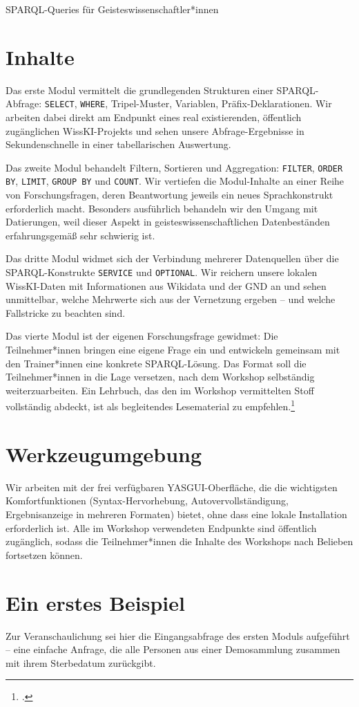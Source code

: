 \begin{beitrag}{SPARQL-Queries für Geisteswissenschaftler*innen}
\section{Inhalte}
Das erste Modul vermittelt die grundlegenden Strukturen einer SPARQL-Abfrage: \texttt{SELECT}, \texttt{WHERE}, Tripel-Muster, Variablen, Präfix-Deklarationen. Wir arbeiten dabei direkt am Endpunkt eines real existierenden, öffentlich zugänglichen WissKI-Projekts und sehen unsere Abfrage-Ergebnisse in Sekundenschnelle in einer tabellarischen Auswertung.

Das zweite Modul behandelt Filtern, Sortieren und Aggregation: \texttt{FILTER}, \texttt{ORDER BY}, \texttt{LIMIT}, \texttt{GROUP BY} und \texttt{COUNT}. Wir vertiefen die Modul-Inhalte an einer Reihe von Forschungsfragen, deren Beantwortung jeweils ein neues Sprachkonstrukt erforderlich macht. Besonders ausführlich behandeln wir den Umgang mit Datierungen, weil dieser Aspekt in geisteswissenschaftlichen Datenbeständen erfahrungsgemäß sehr schwierig ist.

Das dritte Modul widmet sich der Verbindung mehrerer Datenquellen über die SPARQL-Konstrukte \texttt{SERVICE} und \texttt{OPTIONAL}. Wir reichern unsere lokalen WissKI-Daten mit Informationen aus Wikidata und der GND an und sehen unmittelbar, welche Mehrwerte sich aus der Vernetzung ergeben -- und welche Fallstricke zu beachten sind.

Das vierte Modul ist der eigenen Forschungsfrage gewidmet: Die Teilnehmer*innen bringen eine eigene Frage ein und entwickeln gemeinsam mit den Trainer*innen eine konkrete SPARQL-Lösung. Das Format soll die Teilnehmer*innen in die Lage versetzen, nach dem Workshop selbständig weiterzuarbeiten. Ein Lehrbuch, das den im Workshop vermittelten Stoff vollständig abdeckt, ist als begleitendes Lesematerial zu empfehlen.\footcite[112]{schubert2025-sparql-lehrbuch}

\section{Werkzeugumgebung}
Wir arbeiten mit der frei verfügbaren YASGUI-Oberfläche, die die wichtigsten Komfortfunktionen (Syntax-Hervorhebung, Autovervollständigung, Ergebnisanzeige in mehreren Formaten) bietet, ohne dass eine lokale Installation erforderlich ist. Alle im Workshop verwendeten Endpunkte sind öffentlich zugänglich, sodass die Teilnehmer*innen die Inhalte des Workshops nach Belieben fortsetzen können.

\section{Ein erstes Beispiel}
Zur Veranschaulichung sei hier die Eingangsabfrage des ersten Moduls aufgeführt -- eine einfache Anfrage, die alle Personen aus einer Demosammlung zusammen mit ihrem Sterbedatum zurückgibt.


\end{beitrag}
